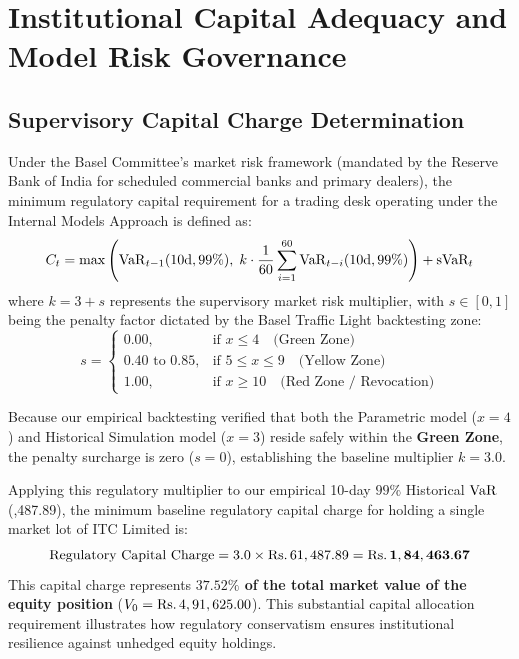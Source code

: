 
\section{Institutional Capital Adequacy and Model Risk Governance}
\label{sec:institutional_capital}

\subsection{Supervisory Capital Charge Determination}

Under the Basel Committee's market risk framework (mandated by the Reserve Bank of India for scheduled commercial banks and primary dealers), the minimum regulatory capital requirement for a trading desk operating under the Internal Models Approach is defined as:
\begin{equation}
    C_t = \max \left( \operatorname{VaR}_{t-1}(10\text{d}, 99\%), \; k \cdot \frac{1}{60} \sum_{i=1}^{60} \operatorname{VaR}_{t-i}(10\text{d}, 99\%) \right) + \text{sVaR}_t
    \label{eq:basel_capital_charge}
\end{equation}
where $k = 3 + s$ represents the supervisory market risk multiplier, with $s \in [0, 1]$ being the penalty factor dictated by the Basel Traffic Light backtesting zone:
\begin{equation}
    s = \begin{cases} 0.00, & \text{if } x \le 4 \quad \text{(Green Zone)} \\ 0.40 \text{ to } 0.85, & \text{if } 5 \le x \le 9 \quad \text{(Yellow Zone)} \\ 1.00, & \text{if } x \ge 10 \quad \text{(Red Zone / Revocation)} \end{cases}
    \label{eq:penalty_factor}
\end{equation}

Because our empirical backtesting verified that both the Parametric model ($x = 4$) and Historical Simulation model ($x = 3$) reside safely within the \textbf{Green Zone}, the penalty surcharge is zero ($s = 0$), establishing the baseline multiplier $k = 3.0$.

Applying this regulatory multiplier to our empirical 10-day $99\%$ Historical $\operatorname{VaR}$ (,487.89), the minimum baseline regulatory capital charge for holding a single market lot of ITC Limited is:
\begin{equation}
    \text{Regulatory Capital Charge} = 3.0 \times \text{\text{Rs.}\,}61,487.89 = \mathbf{\text{\text{Rs.}\,}1,84,463.67}
    \label{eq:capital_computed}
\end{equation}
This capital charge represents \textbf{$37.52\%$ of the total market value of the equity position} ($V_0 = \text{\text{Rs.}\,}4,91,625.00$). This substantial capital allocation requirement illustrates how regulatory conservatism ensures institutional resilience against unhedged equity holdings.

